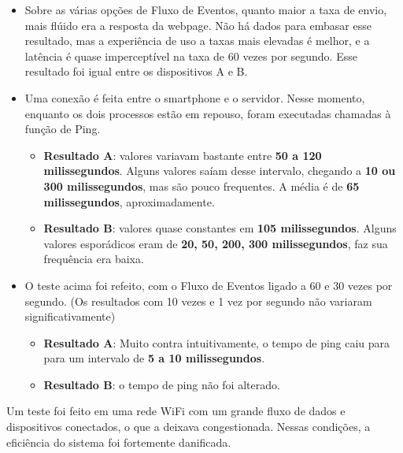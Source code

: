 \documentclass[a4paper,12pt]{article}
\begin{document}
\begin{itemize}

    \item Sobre as várias opções de Fluxo de Eventos, quanto maior a taxa de envio, mais flúido era a resposta da webpage. Não há dados para embasar esse resultado, mas a experiência de uso a taxas mais elevadas é melhor, e a latência é quase imperceptível na taxa de 60 vezes por segundo. Esse resultado foi igual entre os dispositivos A e B.

    \item Uma conexão é feita entre o smartphone e o servidor. Nesse momento, enquanto os dois processos estão em repouso, foram executadas chamadas à função de Ping.

    \begin{itemize}

        \item \textbf{Resultado A}: valores variavam bastante entre \textbf{50 a 120 milissegundos}. Alguns valores saíam desse intervalo, chegando a \textbf{10 ou 300 milissegundos}, mas são pouco frequentes. A média é de \textbf{65 milissegundos}, aproximadamente.

        \item \textbf{Resultado B}: valores quase constantes em \textbf{105 milissegundos}. Alguns valores esporádicos eram de \textbf{20, 50, 200, 300 milissegundos}, faz sua frequência era baixa.

    \end{itemize}

    \item O teste acima foi refeito, com o Fluxo de Eventos ligado a 60 e 30 vezes por segundo. (Os resultados com 10 vezes e 1 vez por segundo não variaram significativamente)

    \begin{itemize}

        \item \textbf{Resultado A}: Muito contra intuitivamente, o tempo de ping caiu para para um intervalo de \textbf{5 a 10 milissegundos}.

        \item \textbf{Resultado B}: o tempo de ping não foi alterado.

    \end{itemize}

\end{itemize}

Um teste foi feito em uma rede WiFi com um grande fluxo de dados e dispositivos conectados, o que a deixava congestionada. Nessas condições, a eficiência do sistema foi fortemente danificada.
\end{document}
